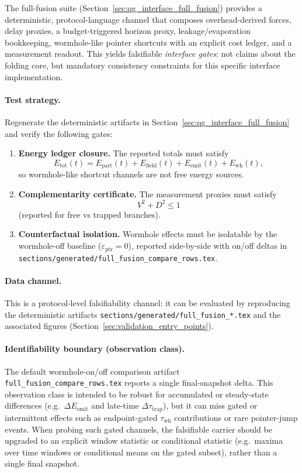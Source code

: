 The full-fusion suite (Section~\ref{sec:qg_interface_full_fusion}) provides a deterministic, protocol-language channel that composes
overhead-derived forces, delay proxies, a budget-triggered horizon proxy, leakage/evaporation bookkeeping, wormhole-like pointer shortcuts with an explicit cost ledger, and a measurement readout.
This yields falsifiable \emph{interface gates}: not claims about the folding core, but mandatory consistency constraints for this specific interface implementation.

\paragraph{Test strategy.}
Regenerate the deterministic artifacts in Section~\ref{sec:qg_interface_full_fusion} and verify the following gates:
\begin{enumerate}
\item \textbf{Energy ledger closure.}
The reported totals must satisfy
\[
E_{\mathrm{tot}}(t)=E_{\mathrm{part}}(t)+E_{\mathrm{field}}(t)+E_{\mathrm{emit}}(t)+E_{\mathrm{wh}}(t),
\]
so wormhole-like shortcut channels are not free energy sources.
\item \textbf{Complementarity certificate.}
The measurement proxies must satisfy
\[
V^2+D^2\le 1
\]
(reported for free vs trapped branches).
\item \textbf{Counterfactual isolation.}
Wormhole effects must be isolatable by the wormhole-off baseline ($\varepsilon_{\mathrm{ptr}}=0$),
reported side-by-side with on/off deltas in \texttt{sections/generated/full\_fusion\_compare\_rows.tex}.
\end{enumerate}

\paragraph{Data channel.}
This is a protocol-level falsifiability channel: it can be evaluated by reproducing the deterministic artifacts
\texttt{sections/generated/full\_fusion\_*.tex} and the associated figures (Section~\ref{sec:validation_entry_points}).

\paragraph{Identifiability boundary (observation class).}
\AuditTag The default wormhole-on/off comparison artifact \texttt{full\_fusion\_compare\_rows.tex} reports a single final-snapshot delta.
This observation class is intended to be robust for accumulated or steady-state differences (e.g.\ $\Delta E_{\mathrm{emit}}$ and late-time $\Delta\tau_{\mathrm{trap}}$),
but it can miss gated or intermittent effects such as endpoint-gated $\tau_{\mathrm{wh}}$ contributions or rare pointer-jump events.
\AuditTag When probing such gated channels, the falsifiable carrier should be upgraded to an explicit window statistic or conditional statistic (e.g.\ maxima over time windows or conditional means on the gated subset), rather than a single final snapshot.

